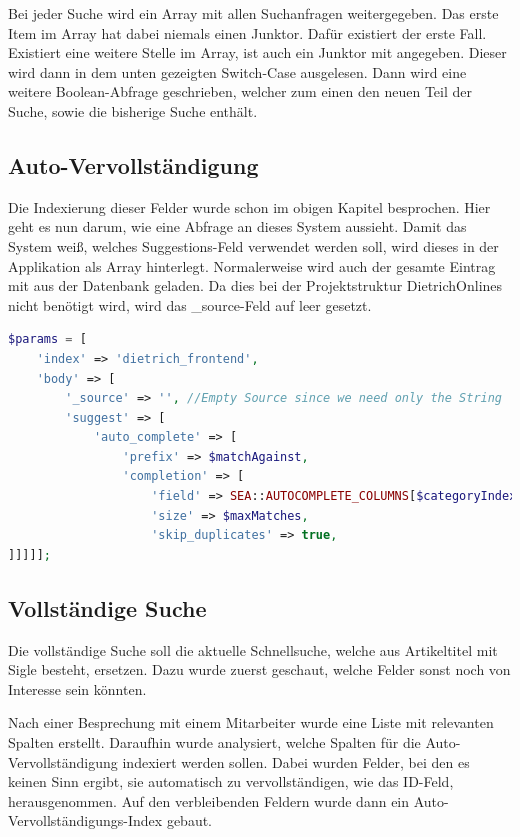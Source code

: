 Bei jeder Suche wird ein Array mit allen Suchanfragen weitergegeben. Das erste Item im Array hat dabei niemals einen Junktor. Dafür existiert der erste Fall. Existiert eine weitere Stelle im Array, ist auch ein Junktor mit angegeben. Dieser wird dann in dem unten gezeigten Switch-Case ausgelesen. Dann wird eine weitere Boolean-Abfrage geschrieben, welcher zum einen den neuen Teil der Suche, sowie die bisherige Suche enthält.



\subsection{Auto-Vervollständigung}

Die Indexierung dieser Felder wurde schon im obigen Kapitel besprochen. Hier geht es nun darum, wie eine Abfrage an dieses System aussieht. Damit das System weiß, welches Suggestions-Feld verwendet werden soll, wird dieses in der Applikation als Array hinterlegt. Normalerweise wird auch der gesamte Eintrag mit aus der Datenbank geladen. Da dies bei der Projektstruktur DietrichOnlines nicht benötigt wird, wird das \_source-Feld auf leer gesetzt.


\begin{lstlisting}[language=PHP, frame=single, label={lst:autocompleParams}] 
$params = [
    'index' => 'dietrich_frontend',
    'body' => [
        '_source' => '', //Empty Source since we need only the String
        'suggest' => [
            'auto_complete' => [
                'prefix' => $matchAgainst,
                'completion' => [
                    'field' => SEA::AUTOCOMPLETE_COLUMNS[$categoryIndex],
                    'size' => $maxMatches,
                    'skip_duplicates' => true,
]]]]];
\end{lstlisting}

\subsection{Vollständige Suche}

Die vollständige Suche soll die aktuelle Schnellsuche, welche aus Artikeltitel mit Sigle besteht, ersetzen. Dazu wurde zuerst geschaut, welche Felder sonst noch von Interesse sein könnten. 

Nach einer Besprechung mit einem Mitarbeiter wurde eine Liste mit relevanten Spalten erstellt. Daraufhin wurde analysiert, welche Spalten für die Auto-Vervollständigung indexiert werden sollen. Dabei wurden Felder, bei den es keinen Sinn ergibt, sie automatisch zu vervollständigen, wie das ID-Feld, herausgenommen. Auf den verbleibenden Feldern wurde dann ein Auto-Vervollständigungs-Index gebaut.

